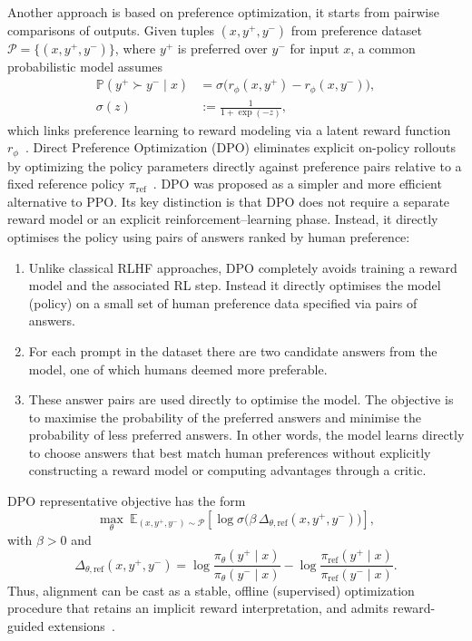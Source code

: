 \documentclass{article}
\numberwithin{equation}{section}
\newcommand{\E}{\mathbb E}
\newcommand{\cP}{\mathcal{P}}
\begin{document}
Another approach is based on preference optimization, it starts from pairwise comparisons of outputs. Given tuples $(x,y^+,y^-)$ from preference dataset $\cP=\{(x,y^+,y^-)\}$, where $y^+$ is preferred over $y^-$ for input $x$, a common probabilistic model assumes
\begin{equation}\label{eq:bt_preference}
    \begin{aligned}
        \mathbb{P}(y^+\succ y^-\mid x)&=\sigma\!\big(r_\phi(x,y^+)-r_\phi(x,y^-)\big),\\
        \sigma(z) &:= \frac{1}{1 + \exp(-z)},
    \end{aligned}
\end{equation}
which links preference learning to reward modeling via a latent reward function $r_\phi$~\cite{bradley1952rank,wirth2017pbrl_survey}.
Direct Preference Optimization (DPO) eliminates explicit on-policy rollouts by optimizing the policy parameters directly against preference pairs relative to a fixed reference policy $\pi_{\mathrm{ref}}$~\cite{rafailov2023direct}. {DPO was proposed as a simpler and
more efficient alternative to PPO}. Its key distinction is that DPO does not require a separate reward model or an explicit reinforcement--learning phase.  Instead, it directly optimises the policy using pairs of answers ranked by human preference:
\begin{enumerate}
  \item Unlike classical RLHF approaches, DPO completely avoids training a reward model and the associated RL step. Instead it directly optimises the model (policy) on a small set of human preference data specified via pairs of answers.
  \item For each prompt in the dataset there are two candidate answers from the model, one of which humans deemed more preferable.
  \item These answer pairs are used directly to optimise the model. The objective is to maximise the probability of the preferred answers and minimise the probability of less preferred answers. In other words, the model learns directly to choose answers that best match human preferences without explicitly constructing a reward model or computing advantages through a critic.
\end{enumerate}
DPO representative objective has the form
\begin{equation}\label{eq:dpo_objective}
\max_{\theta}\ \E_{(x,y^+,y^-)\sim\cP}\left[\log \sigma\!\Big(\beta\,\Delta_{\theta,\mathrm{ref}}(x,y^+,y^-)\Big)\right],
\end{equation}
with $\beta>0$ and
\[
\Delta_{\theta,\mathrm{ref}}(x,y^+,y^-)
=
\log\frac{\pi_\theta(y^+\mid x)}{\pi_\theta(y^-\mid x)}
-
\log\frac{\pi_{\mathrm{ref}}(y^+\mid x)}{\pi_{\mathrm{ref}}(y^-\mid x)}.
\]
Thus, alignment can be cast as a stable, offline (supervised) optimization procedure that retains an implicit reward interpretation, and admits reward-guided extensions~\cite{ding2026rgdpo,wirth2017pbrl_survey}.
\end{document}

